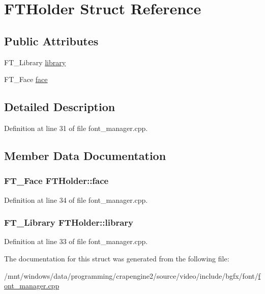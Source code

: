 \hypertarget{struct_f_t_holder}{\section{F\+T\+Holder Struct Reference}
\label{struct_f_t_holder}
}
\subsection*{Public Attributes}
\begin{DoxyCompactItemize}
\item 
F\+T\+\_\+\+Library \hyperlink{struct_f_t_holder_aadb4d7cdce85ef72ee1d8c67adad2e07}{library}
\item 
F\+T\+\_\+\+Face \hyperlink{struct_f_t_holder_a3adc4bf7ffdc896e716035c3af273f35}{face}
\end{DoxyCompactItemize}


\subsection{Detailed Description}


Definition at line 31 of file font\+\_\+manager.\+cpp.



\subsection{Member Data Documentation}
\hypertarget{struct_f_t_holder_a3adc4bf7ffdc896e716035c3af273f35}{
\subsubsection[{face}]{\setlength{\rightskip}{0pt plus 5cm}F\+T\+\_\+\+Face F\+T\+Holder\+::face}}\label{struct_f_t_holder_a3adc4bf7ffdc896e716035c3af273f35}


Definition at line 34 of file font\+\_\+manager.\+cpp.

\hypertarget{struct_f_t_holder_aadb4d7cdce85ef72ee1d8c67adad2e07}{
\subsubsection[{library}]{\setlength{\rightskip}{0pt plus 5cm}F\+T\+\_\+\+Library F\+T\+Holder\+::library}}\label{struct_f_t_holder_aadb4d7cdce85ef72ee1d8c67adad2e07}


Definition at line 33 of file font\+\_\+manager.\+cpp.



The documentation for this struct was generated from the following file\+:\begin{DoxyCompactItemize}
\item 
/mnt/windows/data/programming/crapengine2/source/video/include/bgfx/font/\hyperlink{font__manager_8cpp}{font\+\_\+manager.\+cpp}\end{DoxyCompactItemize}
